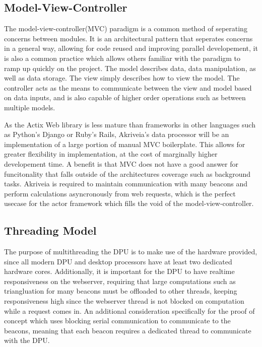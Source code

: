 \subsection{Model-View-Controller}
The model-view-controller(MVC) paradigm is a common method of seperating concerns between modules.
It is an architectural pattern that seperates concerns in a general way, allowing for code reused and improving parallel developement, it is also a common practice which allows others familiar with the paradigm to ramp up quickly on the project.
The model describes data, data manipulation, as well as data storage.
The view simply describes how to view the model.
The controller acts as the means to communicate between the view and model based on data inputs, and is also capable of higher order operations such as between multiple models.

\bigskip
As the Actix Web library is less mature than frameworks in other languages such as Python's Django or Ruby's Rails, Akriveia's data processor will be an implementation of a large portion of manual MVC boilerplate.
This allows for greater flexibility in implementation, at the cost of marginally higher developement time.
A benefit is that MVC does not have a good answer for funcitonality that falls outside of the architectures coverage such as background tasks.
Akriveia is required to maintain communication with many beacons and perform calculations asyncronously from web requests, which is the perfect usecase for the actor framework which fills the void of the model-view-controller.


\bigskip
\pagebreak
\subsection{Threading Model}
The purpose of multithreading the DPU is to make use of the hardware provided, since all modern DPU and desktop processors have at least two dedicated hardware cores.
Additionally, it is important for the DPU to have realtime responsiveness on the webserver, requiring that large computations such as triangluation for many beacons must be offloaded to other threads, keeping responsiveness high since the webserver thread is not blocked on computation while a request comes in. An additional consideration specifically for the proof of concept which uses blocking serial communication to communicate to the beacons, meaning that each beacon requires a dedicated thread to communicate with the DPU.

